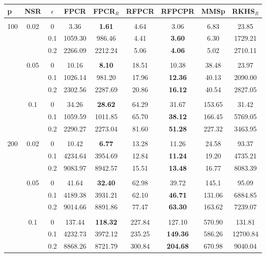 \documentclass[11pt]{article}
\begin{document}
\begin{table}[ht!]


\centering
{\small
\vspace{0.5cm} 
\begin{tabular}{l| c| c | c c c c c c }
p & NSR & $\epsilon$ & FPCR & FPCR$_R$ & RFPCR & RFPCPR & MMSp & RKHS$_R$    \\ \hline\hline  \\[-0.3cm]
\multirow{9}{*}{100} & \multirow{3}{*}{0.02} & 0 & 3.36 & \textbf{1.61} &   4.64 & 3.06 & 6.83 & 23.85 \\ 
& & 0.1 & 1059.30 &  986.46 & 4.41 & \textbf{3.60} & 6.30 & 1729.21  \\
& & 0.2 & 2266.09 & 2212.24 & 5.06 & \textbf{4.06} & 5.02 & 2710.11 \\\cline{2-9} \\[-0.3cm]	
& \multirow{3}{*}{0.05} & 0 &  10.16 & \textbf{8.10} & 18.51 & 10.38 & 38.48 & 23.97   \\
& & 0.1 & 1026.14  & 981.20	  & 17.96 & \textbf{12.36} & 40.13 & 2090.00  \\ 
& & 0.2 & 2302.56  &  2287.69 &  20.86 & \textbf{16.12} & 40.54 & 2827.05  \\\cline{2-9} \\[-0.3cm]
& \multirow{3}{*}{0.1} & 0 &  34.26 & \textbf{28.62} & 64.29 & 31.67
 & 153.65 & 31.42  \\  
& & 0.1 & 1059.59 &  1011.85 & 65.70 & \textbf{38.12} & 166.45 & 5769.05 \\ 
& & 0.2 & 2290.27  &  2273.04 & 81.60 & \textbf{51.28} & 227.32 & 3463.95  \\\cline{1-9} \\[-0.3cm]
\multirow{9}{*}{200} & \multirow{3}{*}{0.02} & 0 & 10.42	 & \textbf{6.77} & 13.28 & 11.26 & 24.58 & 93.37 \\ 
& & 0.1 & 4234.64 & 3954.69 & 12.84 & \textbf{11.24}  & 19.20 & 4735.21  \\
& & 0.2 &  9083.97 & 8942.57 & 15.51 & \textbf{13.48} & 16.77 & 8083.39 \\\cline{2-9} \\[-0.3cm]
& \multirow{3}{*}{0.05} & 0 &  41.64 &  \textbf{32.40} & 62.98 & 39.72 & 145.1 & 95.09 \\
& & 0.1 & 4189.38 & 3931.21 &  62.10 & \textbf{46.71} & 131.06 & 6884.85 \\ 
& & 0.2 &  9014.66 & 8891.86 & 77.47 & \textbf{63.30} & 163.62 & 7239.07 \\\cline{2-9} \\[-0.3cm]
& \multirow{3}{*}{0.1} & 0 &  137.44 & \textbf{118.32} & 227.84  & 127.10 & 570.90 & 131.81 \\  
& & 0.1 & 4232.73 & 3972.12 & 235.25 & \textbf{149.36} & 586.26 & 12700.84	\\ 
& & 0.2 &  8868.26 &   8721.79 &  300.84 & \textbf{204.68} & 670.98 & 9040.04 \\\cline{1-9}
\end{tabular}}


\end{table}
\end{document}
